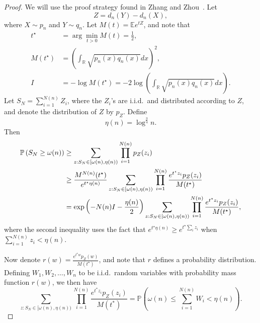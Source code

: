 \begin{proof}
We will use the proof strategy found in Zhang and Zhou~\cite{zhangminimax}. Let 
$$Z = d_n(Y) - d_n(X),$$
where $X \sim p_n$ and $Y \sim q_n$. 
Let $M(t) = \mathbb E e^{tZ}$, and note that
\begin{align*}
t^\star & = \arg\min_{t > 0} M(t) = \frac{1}{2}, \\
M(t^\star) & = \left(\int_{\mathbb R} \sqrt{p_n(x)q_n(x)}dx\right)^2, \\
I & = -\log M(t^\star) = -2\log \left(\int_{\mathbb R} \sqrt{p_n(x)q_n(x)}dx\right).
\end{align*}
Let $S_N = \sum_{i=1}^{N(n)} Z_i$, where the $Z_i$'s are i.i.d.\ and distributed according to $Z$, and denote the distribution of $Z$ by $p_Z$. Define $$\eta(n) = \log^{\frac{3}{4}} n.$$ Then
\begin{align}
\mathbb P\left(S_N \geq \omega(n)\right) &\geq \sum_{z: S_N \in [\omega(n), \eta(n))} \prod_{i=1}^{N(n)} p_Z(z_i) \notag \\
%
&\geq \frac{M^{N(n)}(t^\star)}{e^{t^\star \eta(n)}} \sum_{z: S_N \in [\omega(n), \eta(n))} \prod_{i=1}^{N(n)} \frac{e^{t^\star z_i}p_Z(z_i)}{M(t^\star)} \notag \\
%
&=\exp\left(-N(n)I - \frac{\eta(n)}{2}\right)\sum_{z: S_N \in [\omega(n), \eta(n))} \prod_{i=1}^{N(n)} \frac{e^{t^\star z_i}p_Z(z_i)}{M(t^\star)}, \label{eq: bumbum}
\end{align}
where the second inequality uses the fact that $e^{t^\star \eta(n)} \geq e^{t^\star \sum_i z_i}$ when $\sum_{i=1}^{N(n)} z_i < \eta(n)$.

Now denote $r(w) = \frac{e^{t^\star w}p_Z(w)}{M(t^\star)}$, and note that $r$ defines a probability distribution. Defining $W_1, W_2, \dots, W_n$ to be i.i.d.\ random variables with probability mass function $r(w)$, we then have
\begin{equation}
\label{eq: dundun}
\sum_{z: S_N \in [\omega(n), \eta(n))} \prod_{i=1}^{N(n)} \frac{e^{t^*z_i} p_Z(z_i)}{M(t^*)} = \mathbb P\left(\omega(n) \le \sum_{i=1}^{N(n)} W_i < \eta(n)\right).
\end{equation}




\end{proof}
